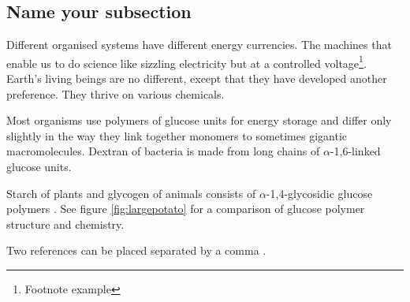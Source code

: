 \subsection{Name your subsection} %
Different organised systems have different energy currencies. The machines that enable us to do science like sizzling electricity but at a controlled voltage\footnote{Footnote example}. Earth's living beings are no different, except that they have developed another preference. They thrive on various chemicals.

Most organisms use polymers of glucose units for energy storage and differ only slightly in the way they link together monomers to sometimes gigantic macromolecules. Dextran of bacteria is made from long chains of $\alpha$-1,6-linked glucose units.









Starch of plants and glycogen of animals consists of $\alpha$-1,4-glycosidic glucose polymers \cite{lastname07}. See figure \ref{fig:largepotato} for a comparison of glucose polymer structure and chemistry.

Two references can be placed separated by a comma \cite{lastname07,name06}.




